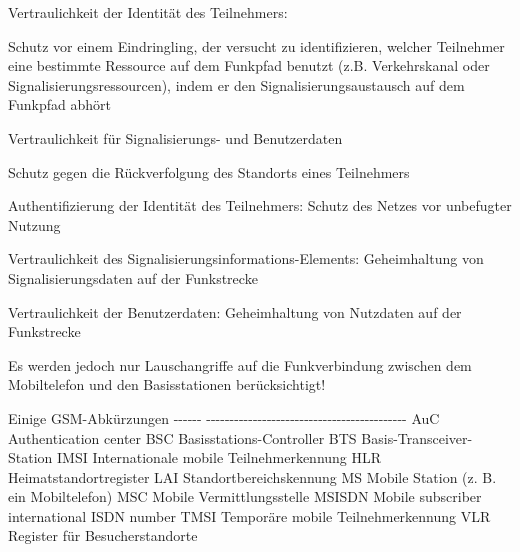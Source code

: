 \documentclass[a4paper]{article}
\begin{document}
\begin{multicols}{3}
\begin{itemize*}
\begin{itemize*}
                  \item Vertraulichkeit der Identität des Teilnehmers:
                  \begin{itemize*}
                        \item Schutz vor einem Eindringling, der versucht zu identifizieren, welcher Teilnehmer eine bestimmte Ressource auf dem Funkpfad benutzt (z.B. Verkehrskanal oder Signalisierungsressourcen), indem er den Signalisierungsaustausch auf dem Funkpfad abhört
                        \item Vertraulichkeit für Signalisierungs- und Benutzerdaten
                        \item Schutz gegen die Rückverfolgung des Standorts eines Teilnehmers
                  \end{itemize*}
                  \item Authentifizierung der Identität des Teilnehmers: Schutz des Netzes vor unbefugter Nutzung
                  \item Vertraulichkeit des Signalisierungsinformations-Elements: Geheimhaltung von Signalisierungsdaten auf der Funkstrecke
                  \item Vertraulichkeit der Benutzerdaten: Geheimhaltung von Nutzdaten auf der Funkstrecke
                  \item Es werden jedoch nur Lauschangriffe auf die Funkverbindung zwischen dem Mobiltelefon und den Basisstationen berücksichtigt!
            \end{itemize*}
      \end{itemize*}

      Einige GSM-Abkürzungen \textbar{} \textbar{} \textbar{} \textbar{}
      -\/-\/-\/-\/-\/- \textbar{}
      -\/-\/-\/-\/-\/-\/-\/-\/-\/-\/-\/-\/-\/-\/-\/-\/-\/-\/-\/-\/-\/-\/-\/-\/-\/-\/-\/-\/-\/-\/-\/-\/-\/-\/-\/-\/-\/-\/-\/-\/-\/-\/-
      \textbar{} \textbar{} AuC \textbar{} Authentication center \textbar{}
      \textbar{} BSC \textbar{} Basisstations-Controller \textbar{} \textbar{}
      BTS \textbar{} Basis-Transceiver-Station \textbar{} \textbar{} IMSI
      \textbar{} Internationale mobile Teilnehmerkennung \textbar{} \textbar{}
      HLR \textbar{} Heimatstandortregister \textbar{} \textbar{} LAI
      \textbar{} Standortbereichskennung \textbar{} \textbar{} MS \textbar{}
      Mobile Station (z. B. ein Mobiltelefon) \textbar{} \textbar{} MSC
      \textbar{} Mobile Vermittlungsstelle \textbar{} \textbar{} MSISDN
      \textbar{} Mobile subscriber international ISDN number \textbar{}
      \textbar{} TMSI \textbar{} Temporäre mobile Teilnehmerkennung \textbar{}
      \textbar{} VLR \textbar{} Register für Besucherstandorte \textbar{}


\end{multicols}
\end{document}
